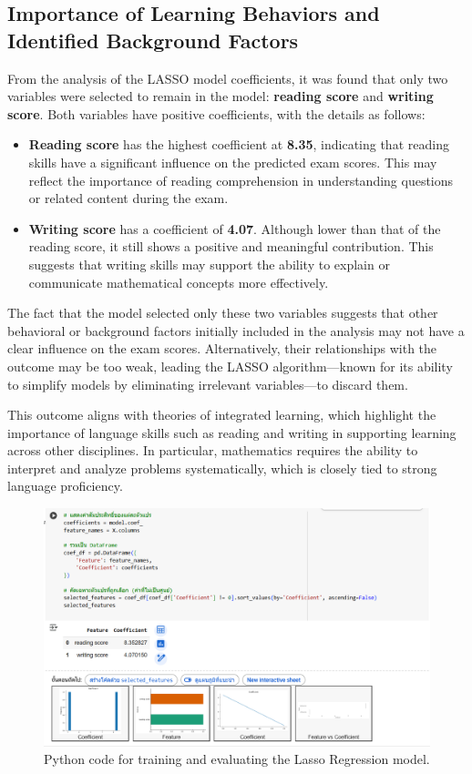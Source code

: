 \documentclass[a4paper,12pt]{article}
\begin{document}
	\subsection{Importance of Learning Behaviors and Identified Background Factors}

	From the analysis of the LASSO model coefficients, it was found that only two variables were selected to remain in the model: \textbf{reading score} and \textbf{writing score}. Both variables have positive coefficients, with the details as follows:

	\begin{itemize}
	\item \textbf{Reading score} has the highest coefficient at \textbf{8.35}, indicating that reading skills have a significant influence on the predicted exam scores. This may reflect the importance of reading comprehension in understanding questions or related content during the exam.
	
	\item \textbf{Writing score} has a coefficient of \textbf{4.07}. Although lower than that of the reading score, it still shows a positive and meaningful contribution. This suggests that writing skills may support the ability to explain or communicate mathematical concepts more effectively.
	\end{itemize}

	The fact that the model selected only these two variables suggests that other behavioral or background factors initially included in the analysis may not have a clear influence on the exam scores. Alternatively, their relationships with the outcome may be too weak, leading the LASSO algorithm---known for its ability to simplify models by eliminating irrelevant variables---to discard them.

	This outcome aligns with theories of integrated learning, which highlight the importance of language skills such as reading and writing in supporting learning across other disciplines. In particular, mathematics requires the ability to interpret and analyze problems systematically, which is closely tied to strong language proficiency.

\begin{figure}[H]
	\centering
	\includegraphics[width=1\textwidth]{pic91.png} %
	\caption{Python code for training and evaluating the Lasso Regression model.}
	\label{fig:lasso-code}
\end{figure}
\end{document}
